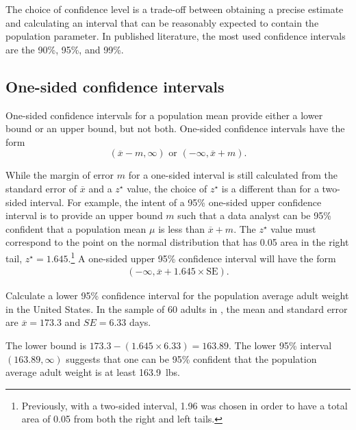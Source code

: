 The choice of confidence level is a trade-off between obtaining a precise estimate and calculating an interval that can be reasonably expected to contain the population parameter. In published literature, the most used confidence intervals are the 90\%, 95\%, and 99\%. 

\subsection{One-sided confidence intervals}
\label{onesidedCIs}

One-sided confidence intervals for a population mean provide either a lower bound or an upper bound, but not both.  One-sided confidence intervals have the form
\[
(\overline{x} - m, \infty) \text{ or } (-\infty, \overline{x} + m).
\]

While the margin of error $m$ for a one-sided interval is still calculated from the standard error of $\overline{x}$ and a $z^\star$ value, the choice of $z^\star$ is a different than for a two-sided interval. For example, the intent of a 95\% one-sided upper confidence interval is to provide an upper bound $m$ such that a data analyst can be 95\% confident that a population mean $\mu$ is less than $\overline{x} + m$. The $z^\star$ value must correspond to the point on the normal distribution that has 0.05 area in the right tail, $z^{\star} = 1.645$.\footnote{Previously, with a two-sided interval, 1.96 was chosen in order to have a total area of 0.05 from both the right and left tails.} A one-sided upper 95\%  confidence interval will have the form
\begin{align*}
(-\infty, \overline{x} + 1.645 \times \text{SE}).
\end{align*}

\begin{examplewrap}
\begin{nexample}{Calculate a lower 95\% confidence interval for the population average adult weight in the United States. In the sample of 60 adults in , the mean and standard error are $\overline{x} = 173.3$ and $SE = 6.33$ days.}
	
The lower bound is $173.3 - (1.645 \times 6.33) = 163.89$. The lower 95\% interval $(163.89, \infty)$ suggests that one can be 95\% confident that the population average adult weight is at least 163.9~lbs. 
\end{nexample}
\end{examplewrap}

